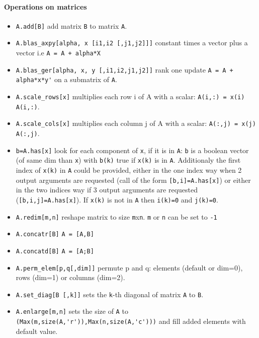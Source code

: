 \paragraph{Operations on matrices}
\begin{itemize}
\item \verb+A.add[B]+  add matrix \verb+B+ to matrix \verb+A+.
\item \verb+A.blas_axpy[alpha, x [i1,i2 [,j1,j2]]]+ constant times a vector plus a vector i.e \verb!A = A + alpha*X!
\item \verb+A.blas_ger[alpha, x, y [,i1,i2,j1,j2]]+  rank one update \verb!A = A + alpha*x*y'!
  on a submatrix of \verb+A+.
\item \verb+A.scale_rows[x]+ multiplies each row i of A with a scalar:
  \verb+A(i,:) = x(i) A(i,:)+. %
\item \verb+A.scale_cols[x]+ multiplies each column j of A with a scalar:
  \verb+A(:,j) = x(j) A(:,j)+. %
\item \verb+b=A.has[x]+ look for each component of \verb+x+, 
  if it is in \verb+A+: \verb+b+ is a boolean vector 
  (of same dim than \verb+x+) with \verb+b(k)+ true if
  \verb+x(k)+ is in \verb+A+. Additionaly the first index of
  \verb+x(k)+ in \verb+A+ could be provided, either in the one index way
  when 2 output arguments are requested (call of the form \verb+[b,i]=A.has[x]+) or
  either in the two indices way if 3 output arguments are requested
  (\verb+[b,i,j]=A.has[x]+). If \verb+x(k)+ is not in \verb+A+ then
  \verb+i(k)=0+ and \verb+j(k)=0+.
\end{itemize}
\begin{itemize}
\item \verb+A.redim[m,n]+ reshape matrix to size \verb+m+x\verb+n+. \verb+m+ or \verb+n+ can be set to \verb+-1+ 
\item \verb+A.concatr[B]+ \verb+A = [A,B]+
\item \verb+A.concatd[B]+ \verb+A = [A;B]+
\item \verb+A.perm_elem[p,q[,dim]]+ permute p and q: elements
  (default or dim=0), rows (dim=1) or columns (dim=2).
\item \verb+A.set_diag[B [,k]]+ sets the \verb+k+-th diagonal of matrix \verb+A+ to \verb+B+.
\item \verb+A.enlarge[m,n]+ sets the size of \verb+A+ to \verb+(Max(m,size(A,'r')),Max(n,size(A,'c')))+ and fill 
  added elements with default value.
\end{itemize}

